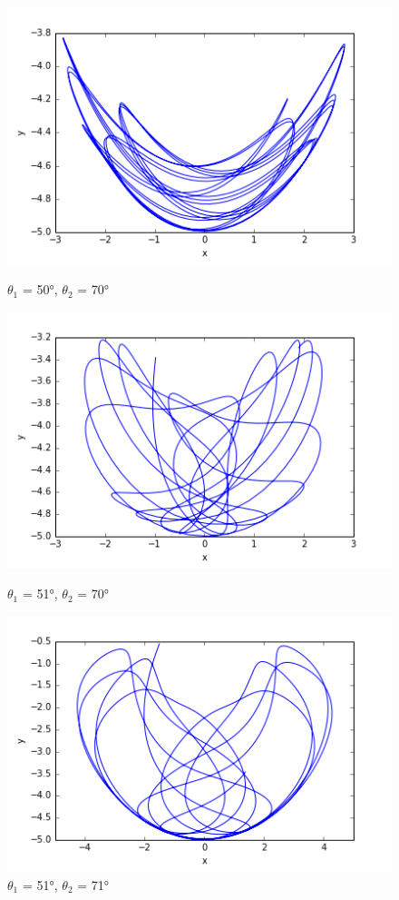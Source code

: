 \documentclass{article}
\begin{document}
\begin{figure}[!ht]
  \includegraphics[width=\linewidth]{img1.png}
  \caption{$\theta_1$ = 50°, $\theta_2$ = 70°}
\endminipage\hfill
{}
  \includegraphics[width=\linewidth]{img3.png}
  \caption{$\theta_1$ = 51°, $\theta_2$ = 70°}
\endminipage\hfill
{}%
  \includegraphics[width=\linewidth]{img2.png}
  \caption{$\theta_1$ = 51°, $\theta_2$ = 71°}
\endminipage
\end{figure}
\end{document}
